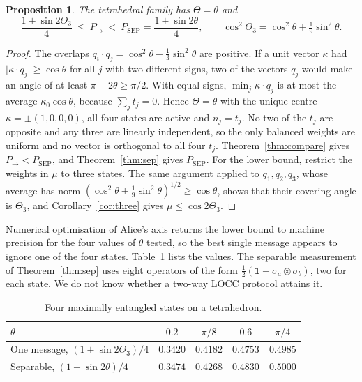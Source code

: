 \documentclass[11pt,a4paper]{article}
\newtheorem{proposition}[theorem]{Proposition}
\theoremstyle{definition}
\theoremstyle{plain}
\newcommand{\one}{\mathbf{1}}
\newcommand{\Pow}{P_{\to}}
\newcommand{\Psep}{P_{\mathrm{SEP}}}
\begin{document}
\begin{proposition}\label{prop:tetra}
The tetrahedral family has $\Theta=\theta$ and
\[
\frac{1+\sin2\Theta_3}{4}\ \le\ \Pow\ <\ \Psep=\frac{1+\sin2\theta}{4},
\qquad \cos^2\Theta_3=\cos^2\theta+\tfrac19\sin^2\theta .
\]
\end{proposition}
\begin{proof}
The overlaps $q_i\cdot q_j=\cos^2\theta-\tfrac13\sin^2\theta$ are positive. If
a unit vector $\kappa$ had $\lvert\kappa\cdot q_j\rvert\ge\cos\theta$ for all
$j$ with two different signs, two of the vectors $q_j$ would make an angle of
at least $\pi-2\theta\ge\pi/2$. With equal signs, $\min_j\kappa\cdot q_j$ is at most
the average $\kappa_0\cos\theta$, because $\sum_jt_j=0$. Hence
$\Theta=\theta$ with the unique centre $\kappa=\pm(1,0,0,0)$, all four states
are active and $n_j=t_j$. No two of the $t_j$ are opposite and any three are
linearly independent, so the only balanced weights are uniform and no vector
is orthogonal to all four $t_j$. Theorem~\ref{thm:compare} gives
$\Pow<\Psep$, and Theorem~\ref{thm:sep} gives $\Psep$. For the lower bound,
restrict the weights in $\mu$ to three states. The same argument applied to
$q_1,q_2,q_3$, whose average has norm
$(\cos^2\theta+\tfrac19\sin^2\theta)^{1/2}\ge\cos\theta$, shows that their
covering angle is $\Theta_3$, and Corollary~\ref{cor:three} gives
$\mu\le\cos2\Theta_3$.
\end{proof}

Numerical optimisation of Alice's axis returns the lower bound to machine
precision for the four values of $\theta$ tested, so the best single message
appears to ignore one of the four states. Table~\ref{tab:tetra} lists the
values. The separable measurement of Theorem~\ref{thm:sep} uses eight
operators of the form $\tfrac12(\one+\sigma_a\otimes\sigma_b)$, two for each
state. We do not know whether a two-way LOCC protocol attains it.

\begin{table}[h]
\centering
\begin{tabular}{lcccc}
\toprule
$\theta$&$0.2$&$\pi/8$&$0.6$&$\pi/4$\\
\midrule
One message, $(1+\sin2\Theta_3)/4$&$0.3420$&$0.4182$&$0.4753$&$0.4985$\\
Separable, $(1+\sin2\theta)/4$&$0.3474$&$0.4268$&$0.4830$&$0.5000$\\
\bottomrule
\end{tabular}
\caption{Four maximally entangled states on a tetrahedron.}\label{tab:tetra}
\end{table}
\end{document}

